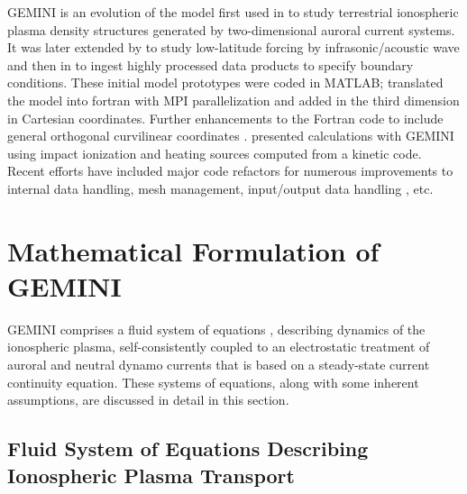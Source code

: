 \documentclass[11pt,letterpaper]{article}
\begin{document}
GEMINI is an evolution of the model first used in \citet{Zettergren:2012} to study terrestrial ionospheric plasma density structures generated by two-dimensional auroral current systems.  It was later extended by \citet{Zettergren:2013} to study low-latitude forcing by infrasonic/acoustic wave and then in \citet{Zettergren:2014} to ingest highly processed data products to specify boundary conditions.  These initial model prototypes were coded in MATLAB; \citet{Zettergren:2015b} translated the model into fortran with MPI parallelization and added in the third dimension in Cartesian coordinates.  Further enhancements to the Fortran code to include general orthogonal curvilinear coordinates \citep{Zettergren:2019}.  \citet{Diaz:2021} presented calculations with GEMINI using impact ionization and heating sources computed from a kinetic code.  Recent efforts have included major code refactors for numerous improvements to internal data handling, mesh management, input/output data handling \citep{Clayton:2021}, etc. 


\section{Mathematical Formulation of GEMINI}

GEMINI comprises a fluid system of equations \citep{Schunk:1977,Blelly:1993,Huba:2000}, describing dynamics of the ionospheric plasma, self-consistently coupled to an electrostatic treatment of auroral and neutral dynamo currents that is based on a steady-state current continuity equation.  These systems of equations, along with some inherent assumptions, are discussed in detail in this section.  


\subsection{Fluid System of Equations Describing Ionospheric Plasma Transport}
\end{document}
